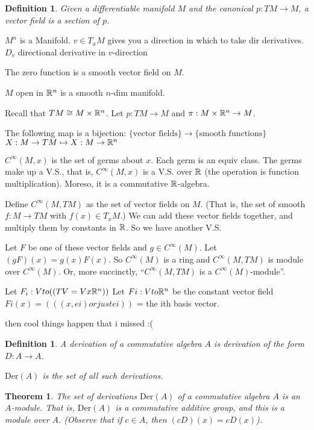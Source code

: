 \documentclass[11pt,leqno,oneside]{amsart}
\newenvironment{dateenv}{
	\vspace{1em}
}{
	\vspace{1em}
}
\newcommand{\Der}{\text{Der}}
\newcommand{\de}{\emph}
\newcommand{\mydate}[4]{
	\newdate{#1}{#2}{#3}{#4}
	\begin{dateenv}
		\hfill\displaydate{#1}
	\end{dateenv}
}
\theoremstyle{mystyle} \newtheorem{thrm}[thm]{Theorem}
\theoremstyle{mystyle} \newtheorem{defi}[thm]{Definition}
\begin{document}
\mydate{d5}{10}{10}{2016}

\begin{defi}
	Given a differentiable manifold $M$ and the canonical $p: TM \to M$, a \de{vector field} is a section of $p$.
\end{defi}


$M^n$ is a Manifold.
$v \in T_xM$ gives you a direction in which to take dir derivatives.
$D_v$ directional derivative in $v$-direction

\begin{example}
	The zero function is a smooth vector field on $M$.
\end{example}
\begin{example}
	$M$ open in ${\mathbb R}^n$ is a smooth $n$-dim manifold.

	Recall that $TM \mathrel{\cong}   M \times {\mathbb R}^n$.  Let $p:TM \to M$ and $\pi:M \times {\mathbb R}^n \to M$.

	The following map is a bijection:
	$\{\text{vector fields}\} \to \{\text{smooth functions}\}$
	$        X: M \to TM      \mapsto     X: M \to {\mathbb R}^n$
\end{example}
\begin{example}
	$C^\infty(M,x)$ is the set of germs about $x$.
	Each germ is an equiv class.
	The germs make up a V.S., that is, $C^\infty(M,x)$ is a V.S. over ${\mathbb R}$ (the operation is function multiplication).  Moreso, it is a commutative ${\mathbb R}$-algebra.

	Define $C^\infty(M, TM)$ as the set of vector fields on $M$.  (That is, the set of smooth $f: M \to TM$ with $f(x) \in T_xM$.)  We can add these vector fields together, and multiply them by constants in ${\mathbb R}$.  So we have another V.S.

	Let $F$ be one of these vector fields and $g \in C^\infty(M)$.
	Let $(gF)(x) = g(x)F(x)$.
	So $C^\infty(M)$ is a ring and $C^\infty(M, TM)$ is module over $C^\infty(M)$.  Or, more succinctly, ``$C^\infty(M, TM)$ is a $C^\infty(M)$-module''.

	Let $F_i : V to ((TV = Vx{\mathbb R}^n))$
	Let $Fi : V to {\mathbb R}^n$ be the constant vector field $Fi(x) = (((x,ei) or just ei))$ = the ith basis vector.

	then cool things happen that i missed :(
\end{example}
\begin{defi}
	A \de{derivation} of a commutative algebra $A$ is derivation of the form $D: A \to A$.

	$\Der(A)$ is the set of all such derivations.
\end{defi}
\begin{thrm}
	The set of derivations $\Der(A)$ of a commutative algebra $A$ is an $A$-module.  That is, $\Der(A)$ is a commutative additive group, and this is a module over $A$.  (Observe that if $c \in A$, then $(cD)(x) = cD(x)$).
\end{thrm}
\end{document}
